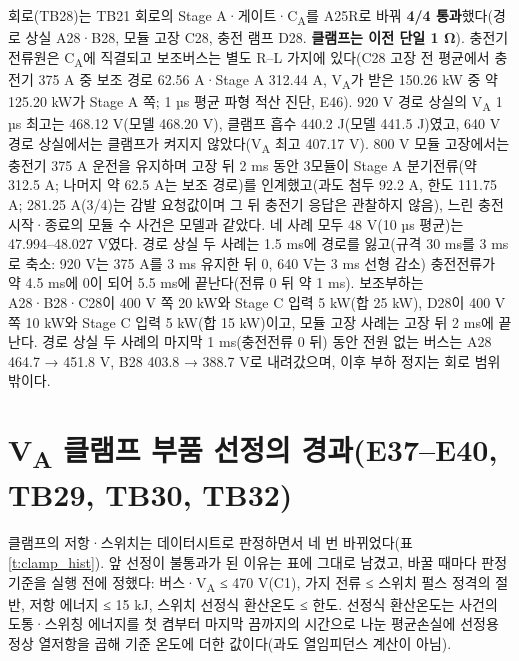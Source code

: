 회로(TB28)는 TB21 회로의 Stage A·게이트·C\textsubscript{A}를 A25R로 바꿔 \textbf{4/4 통과}했다(경로 상실 A28·B28, 모듈 고장 C28, 충전 램프 D28. \textbf{클램프는 이전 단일 1 Ω}). 충전기 전류원은 C\textsubscript{A}에 직결되고 보조버스는 별도 R–L 가지에 있다(C28 고장 전 평균에서 충전기 375 A 중 보조 경로 62.56 A·Stage A 312.44 A, V\textsubscript{A}가 받은 150.26 kW 중 약 125.20 kW가 Stage A 쪽; 1 µs 평균 파형 적산 진단, E46). 920 V 경로 상실의 V\textsubscript{A} 1 µs 최고는 468.12 V(모델 468.20 V), 클램프 흡수 440.2 J(모델 441.5 J)였고, 640 V 경로 상실에서는 클램프가 켜지지 않았다(V\textsubscript{A} 최고 407.17 V). 800 V 모듈 고장에서는 충전기 375 A 운전을 유지하며 고장 뒤 2 ms 동안 3모듈이 Stage A 분기전류(약 312.5 A; 나머지 약 62.5 A는 보조 경로)를 인계했고(과도 첨두 92.2 A, 한도 111.75 A; 281.25 A(3/4)는 감발 요청값이며 그 뒤 충전기 응답은 관찰하지 않음), 느린 충전 시작·종료의 모듈 수 사건은 모델과 같았다. 네 사례 모두 48 V(10 µs 평균)는 47.994–48.027 V였다. 경로 상실 두 사례는 1.5 ms에 경로를 잃고(규격 30 ms를 3 ms로 축소: 920 V는 375 A를 3 ms 유지한 뒤 0, 640 V는 3 ms 선형 감소) 충전전류가 약 4.5 ms에 0이 되어 5.5 ms에 끝난다(전류 0 뒤 약 1 ms). 보조부하는 A28·B28·C28이 400 V 쪽 20 kW와 Stage C 입력 5 kW(합 25 kW), D28이 400 V 쪽 10 kW와 Stage C 입력 5 kW(합 15 kW)이고, 모듈 고장 사례는 고장 뒤 2 ms에 끝난다. 경로 상실 두 사례의 마지막 1 ms(충전전류 0 뒤) 동안 전원 없는 버스는 A28 464.7 → 451.8 V, B28 403.8 → 388.7 V로 내려갔으며, 이후 부하 정지는 회로 범위 밖이다.

\section{V\textsubscript{A} 클램프 부품 선정의 경과(E37–E40, TB29, TB30, TB32)}

클램프의 저항·스위치는 데이터시트로 판정하면서 네 번 바뀌었다(표 \ref{t:clamp_hist}). 앞 선정이 불통과가 된 이유는 표에 그대로 남겼고, 바꿀 때마다 판정 기준을 실행 전에 정했다: 버스·V\textsubscript{A} ≤ 470 V(C1), 가지 전류 ≤ 스위치 펄스 정격의 절반, 저항 에너지 ≤ 15 kJ, 스위치 선정식 환산온도 ≤ 한도. 선정식 환산온도는 사건의 도통·스위칭 에너지를 첫 켬부터 마지막 끔까지의 시간으로 나눈 평균손실에 선정용 정상 열저항을 곱해 기준 온도에 더한 값이다(과도 열임피던스 계산이 아님).

